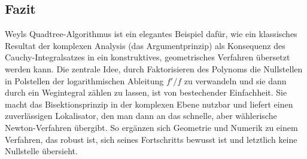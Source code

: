 \subsection{Fazit%
\label{weyl:subsection:fazit}}
Weyls Quadtree-Algorithmus ist ein elegantes Beispiel dafür, wie ein klassisches
Resultat der komplexen Analysis (das Argumentprinzip) als Konsequenz des Cauchy-Integralsatzes
in ein konstruktives, geometrisches Verfahren übersetzt werden kann.
Die zentrale Idee, durch Faktorisieren des Polynoms die Nullstellen in Polstellen der
logarithmischen Ableitung $f'/f$ zu verwandeln und sie dann durch ein Wegintegral
zählen zu lassen, ist von bestechender Einfachheit.
Sie macht das Bisektionsprinzip in der komplexen Ebene nutzbar und liefert einen
zuverlässigen Lokalisator, den man dann an das schnelle, aber wählerische
Newton-Verfahren übergibt.
So ergänzen sich Geometrie und Numerik zu einem Verfahren, das robust ist, sich seines
Fortschritts bewusst ist und letztlich keine Nullstelle übersieht.
